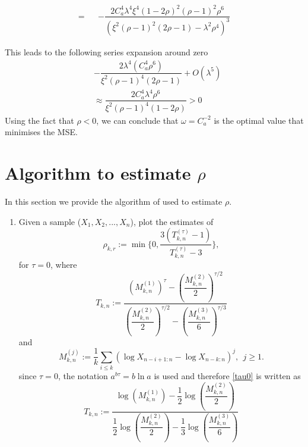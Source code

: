 \begin{subappendices}
\begin{eqnarray*}
=&&-\dfrac{2 C_a^4 \lambda ^4 \xi ^4 (1-2 \rho )^2 (\rho -1)^2 \rho ^6}{\left(\xi ^2 (\rho -1)^2 (2 \rho -1)-\lambda ^2 \rho ^4\right)^3}
\end{eqnarray*}

This leads to the following series expansion around zero
\begin{eqnarray*}
&-\dfrac{2 \lambda ^4 \left(C_a^4 \rho ^6\right)}{\xi ^2 (\rho -1)^4 (2 \rho -1)}+O\left(\lambda ^5\right) \\&\approx
\dfrac{2 C_a^4 \lambda ^4 \rho ^6}{\xi ^2 (\rho -1)^4 (1-2 \rho)} > 0
\end{eqnarray*}Using the fact that $\rho < 0$, we can conclude that $\omega = C_a^{-2}$ is the optimal value that minimises the MSE.
\label{appendix1a}
\newpage
\section{Algorithm to estimate $\rho$}
	In this section we provide the algorithm of \cite{alves2003new} used to estimate $\rho$.
	\begin{enumerate}
			\item Given a sample ($X_1,X_2,...,X_n$), plot the estimates of \begin{equation}\label{pkt}
			\hat{\rho}_{k,r}:=\min\{0,\dfrac{3(T^{(\tau)}_{k,n}-1)}{T^{(\tau)}_{k,n}-3}\},
			\end{equation}for $\tau=0$, where 
			\begin{equation}\label{tau0}
			T_{k,n}:= \dfrac{\left(M_{k,n}^{(1)}\right)^{\tau}-\left(\dfrac{M^{(2)}_{k,n}}{2}\right)^{\tau/2}}{\left(\dfrac{M^{(2)}_{k,n}}{2}\right)^{\tau/2}-\left(\dfrac{M^{(3)}_{k,n}}{6}\right)^{\tau/3}}
			\end{equation}and
			\begin{equation}
			M^{(j)}_{k,n}:=\dfrac{1}{k}\sum_{i\leq k}^{}(\log X_{n-i+1:n}-\log X_{n-k:n})^j, \ \ j \geq 1.
			\end{equation}since $\tau=0$, the notation $a^{b\tau}=b\ln a$ is used and therefore \autoref{tau0} is written as
			\begin{equation}
			T_{k,n}:= \dfrac{\log(M_{k,n}^{(1)})-\dfrac{1}{2}\log\left(\dfrac{M^{(2)}_{k,n}}{2}\right)}{\dfrac{1}{2}\log\left(\dfrac{M^{(2)}_{k,n}}{2}\right)-\dfrac{1}{3}\log\left(\dfrac{M^{(3)}_{k,n}}{6}\right)}
			\end{equation}
			

\end{enumerate}
\end{subappendices}

